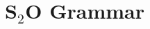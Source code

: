 \documentclass[preprint,5p,twocolumn,12pt]{elsarticle}
\newcommand{\subscript}[1]{\ensuremath{_{\textrm{#1}}}}
\newcommand{\bigstwoo}{\textsc{S\subscript{2}O}\xspace}
\begin{document}



%






\appendix
\section{\bigstwoo Grammar}
\label{sec:appendixStwoo}
\end{document}

